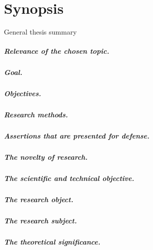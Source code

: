 \renewcommand{\thesubfigure}{\alph{subfigure}}
\renewcommand{\figurename}{Figure}
\renewcommand{\tablename}{Table}
\setcounter{figure}{0}
\setcounter{table}{0}

\chapter*{Synopsis}

\begin{center}
    General thesis summary
\end{center}


\paragraph*{Relevance of the chosen topic.}
\paragraph*{Goal.}
\paragraph*{Objectives.}
\paragraph*{Research methods.}
\paragraph*{Assertions that are presented for defense.}
\paragraph*{The novelty of research.}
\paragraph*{The scientific and technical objective.}
\paragraph*{The research object.}
\paragraph*{The research subject.}
\paragraph*{The theoretical significance.}
